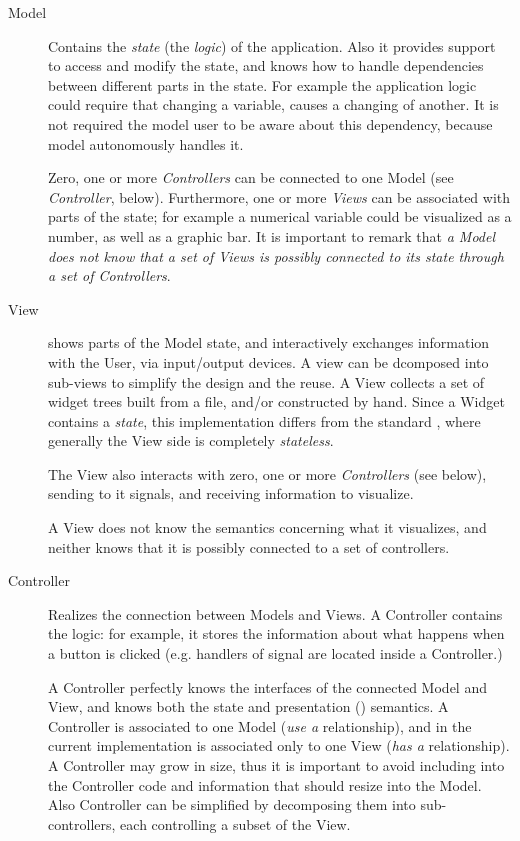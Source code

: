 \begin{description}
\item[Model] Contains the \emph{state} (the \emph{logic}) of the
  application. Also it provides support to access and modify the
  state, and knows how to handle dependencies between different parts
  in the state. For example the application logic could require that
  changing a variable, causes a changing of another. It is not
  required the model user to be aware about this dependency, because
  model autonomously handles it.

  Zero, one or more \emph{Controllers} can be connected to one Model
  (see \emph{Controller}, below). Furthermore, one or more
  \emph{Views} can be associated with parts of the state; for example
  a numerical variable could be visualized as a number, as well as a
  graphic bar. It is important to remark that \emph{a Model does not
    know that a set of Views is possibly connected to its state
    through a set of Controllers}.

\item[View] shows parts of the Model state, and interactively
  exchanges information with the User, via input/output devices.
  A view can be dcomposed into sub-views to simplify the design and
  the reuse. 
  A View collects a set of widget trees built from a
  \glade file, and/or constructed by hand. Since a Widget contains a
  \emph{state}, this implementation differs from the standard \mvc,
  where generally the View side is completely \emph{stateless}.

  The View also interacts with zero, one or more \emph{Controllers}
  (see below), sending to it signals, and receiving information to
  visualize.

  A View does not know the semantics concerning what it visualizes,
  and neither knows that it is possibly connected to a set of
  controllers.

\item[Controller] Realizes the connection between Models and Views.
  A Controller contains the \gui logic: for example, it stores the
  information about what happens when a button is clicked (e.g. 
  handlers of signal are located inside a Controller.)

  A Controller perfectly knows the interfaces of the connected Model
  and View, and knows both the state and presentation (\gui)
  semantics. A Controller is associated to one Model (\emph{use a}
  relationship), and in the current implementation is associated
  only to one View (\emph{has a} relationship). A Controller may 
  grow in size, thus it is important to avoid including into the
  Controller code and information that should resize into the
  Model. Also Controller can be simplified by decomposing them into
  sub-controllers, each controlling a subset of the View. 

\end{description}

